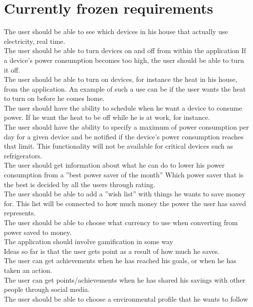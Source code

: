 \chapter{Currently frozen requirements}

The user should be able to see which devices in his house that actually use electricity, real time.\\
The user should be able to turn devices on and off from within the application
If a device's power consumption becomes too high, the user should be able to turn it off.\\
The user should be able to turn on devices, for instance the heat in his house, from the application. An example of such a use can be if the user wants the heat to turn on before he comes home.\\
The user should have the ability to schedule when he want a device to consume power. If he want the heat to be off while he is at work, for instance. \\
The user should have the ability to specify a maximum of power consumption per day for a given device and be notified if the device's power consumption reaches that limit. This functionality will not be available for critical devices such as refrigerators. \\
The user should get information about what he can do to lower his power consumption from a ''best power saver of the month'' Which power saver that is the best is decided by all the users through rating.\\
The user should be able to add a ''wish list'' with things he wants to save money for. This list will be connected to how much money the power the user has saved represents.\\
The user should be able to choose what currency to use when converting from power saved to money.\\
The application should involve gamification in some way\\
Ideas so far is that the user gets point as a result of how much he saves.\\
The user can get achievements when he has reached his goals, or when he has taken an action.\\
The user can get points/achievements when he has shared his savings with other people through social media.\\
The user should be able to choose a environmental profile that he wants to follow
\\
